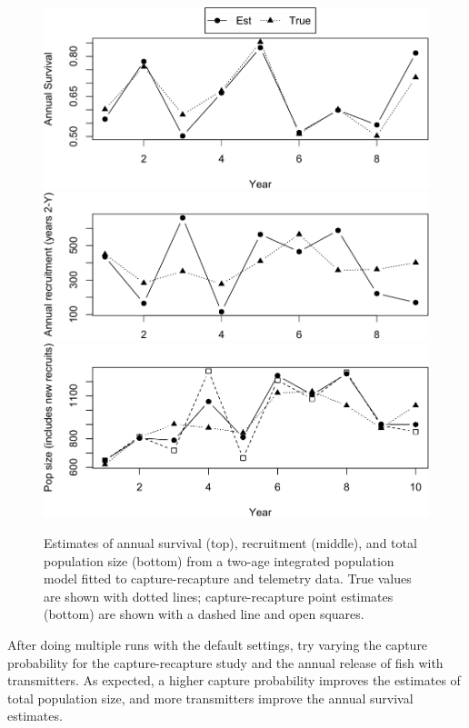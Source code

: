 \documentclass[
]{krantz}
\begin{document}
\begin{figure}
\includegraphics[width=0.9\linewidth]{bookdown_files/figure-latex/TwoAgePlot-1} \includegraphics[width=0.9\linewidth]{bookdown_files/figure-latex/TwoAgePlot-2} \includegraphics[width=0.9\linewidth]{bookdown_files/figure-latex/TwoAgePlot-3} \caption{Estimates of annual survival (top), recruitment (middle), and total population size (bottom) from a two-age integrated population model fitted to capture-recapture and telemetry data. True values are shown with dotted lines; capture-recapture point estimates (bottom) are shown with a dashed line and open squares.}\label{fig:TwoAgePlot}
\end{figure}

After doing multiple runs with the default settings, try varying the capture probability for the capture-recapture study and the annual release of fish with transmitters. As expected, a higher capture probability improves the estimates of total population size, and more transmitters improve the annual survival estimates.
\end{document}
